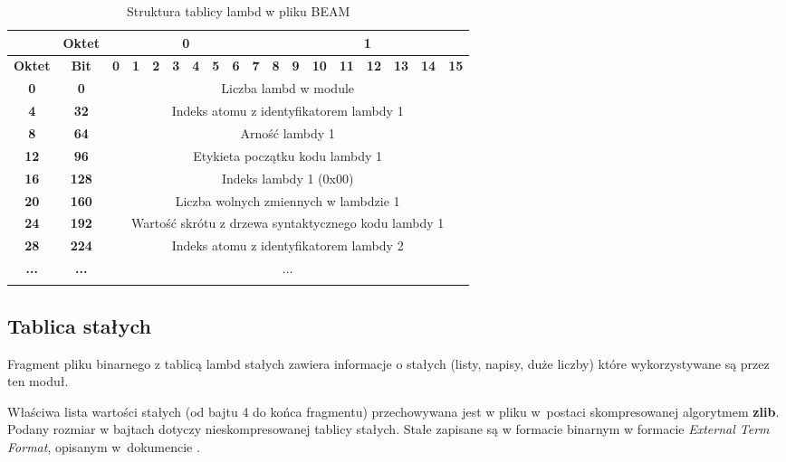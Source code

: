 \begin{longtable}{|c|c|c|c|c|c|c|c|c|c|c|c|c|c|c|c|c|c|}
\hline
         & \textbf{Oktet} & \multicolumn{8}{|c|}{\textbf{0}} & \multicolumn{8}{|c|}{\textbf{1}} \\
\hline
\textbf{Oktet} & \textbf{Bit} & \textbf{0} & \textbf{1} & \textbf{2} & \textbf{3} & \textbf{4} & \textbf{5} & \textbf{6} & \textbf{7} & \textbf{8} & \textbf{9} & \textbf{10} & \textbf{11} & \textbf{12} & \textbf{13} & \textbf{14} & \textbf{15}\\
\hline
\textbf{0} & \textbf{0} & \multicolumn{16}{|c|}{Liczba lambd w module} \\[3ex]
\hline
\textbf{4} & \textbf{32} & \multicolumn{16}{|c|}{Indeks atomu z identyfikatorem lambdy 1}\\[3ex]
\hline
\textbf{8} & \textbf{64} & \multicolumn{16}{|c|}{Arność lambdy 1} \\[3ex]
\hline
\textbf{12} & \textbf{96} & \multicolumn{16}{|c|}{Etykieta początku kodu lambdy 1}\\[3ex]
\hline
\textbf{16} & \textbf{128} & \multicolumn{16}{|c|}{Indeks lambdy 1 (0x00)}\\[3ex]
\hline
\textbf{20} & \textbf{160} & \multicolumn{16}{|c|}{Liczba wolnych zmiennych w lambdzie 1}\\[3ex]
\hline
\textbf{24} & \textbf{192} & \multicolumn{16}{|c|}{Wartość skrótu z drzewa syntaktycznego kodu lambdy 1}\\[3ex]
\hline
\textbf{28} & \textbf{224} & \multicolumn{16}{|c|}{Indeks atomu z identyfikatorem lambdy 2}\\[3ex]
\hline
\textbf{...} & \textbf{...} & \multicolumn{16}{|c|}{...}  \\[3ex]
\hline
\caption{Struktura tablicy lambd w pliku BEAM}
\label{table:lambdatable} \\
\end{longtable}

\subsection{Tablica stałych}
Fragment pliku binarnego z tablicą lambd stałych zawiera informacje o stałych (listy, napisy, duże liczby) które wykorzystywane są przez ten moduł.

Właściwa lista wartości stałych (od bajtu 4 do końca fragmentu) przechowywana jest w pliku w~postaci skompresowanej algorytmem \textbf{zlib}. Podany rozmiar w bajtach dotyczy nieskompresowanej tablicy stałych.
Stałe zapisane są w formacie binarnym w formacie \emph{External Term Format}, opisanym w~dokumencie \cite{ExternalTermFormat}.

